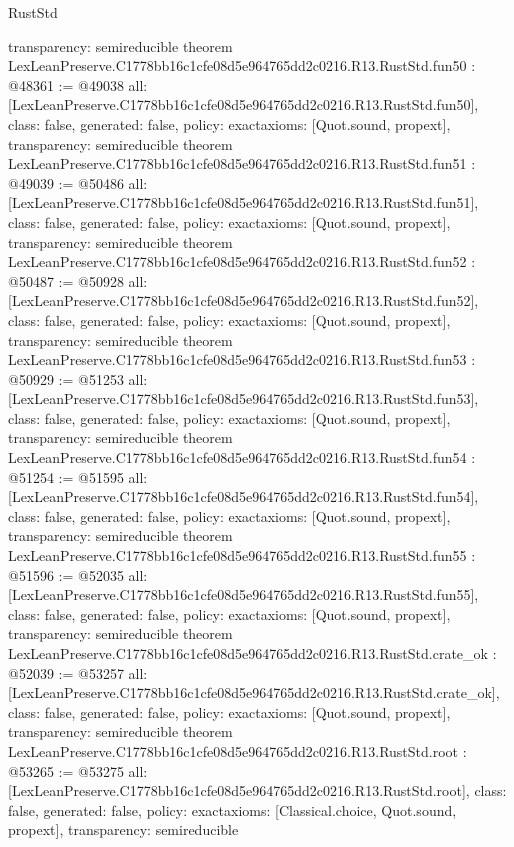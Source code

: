 \begin{lexlean}{RustStd}
\begin{coremodule}
{  transparency: semireducible
}
theorem LexLeanPreserve.C1778bb16c1cfe08d5e964765dd2c0216.R13.RustStd.fun50 : @48361 := @49038 {
  all: [LexLeanPreserve.C1778bb16c1cfe08d5e964765dd2c0216.R13.RustStd.fun50],
  class: false,
  generated: false,
  policy: exact{axioms: [Quot.sound, propext]},
  transparency: semireducible
}
theorem LexLeanPreserve.C1778bb16c1cfe08d5e964765dd2c0216.R13.RustStd.fun51 : @49039 := @50486 {
  all: [LexLeanPreserve.C1778bb16c1cfe08d5e964765dd2c0216.R13.RustStd.fun51],
  class: false,
  generated: false,
  policy: exact{axioms: [Quot.sound, propext]},
  transparency: semireducible
}
theorem LexLeanPreserve.C1778bb16c1cfe08d5e964765dd2c0216.R13.RustStd.fun52 : @50487 := @50928 {
  all: [LexLeanPreserve.C1778bb16c1cfe08d5e964765dd2c0216.R13.RustStd.fun52],
  class: false,
  generated: false,
  policy: exact{axioms: [Quot.sound, propext]},
  transparency: semireducible
}
theorem LexLeanPreserve.C1778bb16c1cfe08d5e964765dd2c0216.R13.RustStd.fun53 : @50929 := @51253 {
  all: [LexLeanPreserve.C1778bb16c1cfe08d5e964765dd2c0216.R13.RustStd.fun53],
  class: false,
  generated: false,
  policy: exact{axioms: [Quot.sound, propext]},
  transparency: semireducible
}
theorem LexLeanPreserve.C1778bb16c1cfe08d5e964765dd2c0216.R13.RustStd.fun54 : @51254 := @51595 {
  all: [LexLeanPreserve.C1778bb16c1cfe08d5e964765dd2c0216.R13.RustStd.fun54],
  class: false,
  generated: false,
  policy: exact{axioms: [Quot.sound, propext]},
  transparency: semireducible
}
theorem LexLeanPreserve.C1778bb16c1cfe08d5e964765dd2c0216.R13.RustStd.fun55 : @51596 := @52035 {
  all: [LexLeanPreserve.C1778bb16c1cfe08d5e964765dd2c0216.R13.RustStd.fun55],
  class: false,
  generated: false,
  policy: exact{axioms: [Quot.sound, propext]},
  transparency: semireducible
}
theorem LexLeanPreserve.C1778bb16c1cfe08d5e964765dd2c0216.R13.RustStd.crate_ok : @52039 := @53257 {
  all: [LexLeanPreserve.C1778bb16c1cfe08d5e964765dd2c0216.R13.RustStd.crate_ok],
  class: false,
  generated: false,
  policy: exact{axioms: [Quot.sound, propext]},
  transparency: semireducible
}
theorem LexLeanPreserve.C1778bb16c1cfe08d5e964765dd2c0216.R13.RustStd.root : @53265 := @53275 {
  all: [LexLeanPreserve.C1778bb16c1cfe08d5e964765dd2c0216.R13.RustStd.root],
  class: false,
  generated: false,
  policy: exact{axioms: [Classical.choice, Quot.sound, propext]},
  transparency: semireducible
}


\end{coremodule}
\end{lexlean}
